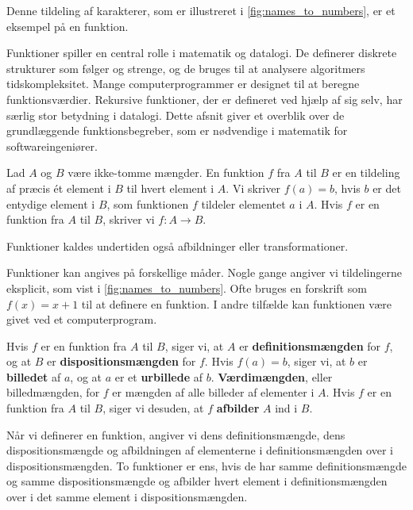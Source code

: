 Denne tildeling af karakterer, som er illustreret i \autoref{fig:names_to_numbers}, er et eksempel på en funktion.

Funktioner spiller en central rolle i matematik og datalogi. De definerer diskrete strukturer som følger og strenge, og de bruges til at analysere algoritmers tidskompleksitet. Mange computerprogrammer er designet til at beregne funktionsværdier. Rekursive funktioner, der er defineret ved hjælp af sig selv, har særlig stor betydning i datalogi. Dette afsnit giver et overblik over de grundlæggende funktionsbegreber, som er nødvendige i matematik for softwareingeniører.

\begin{definition}
Lad $A$ og $B$ være ikke-tomme mængder. En funktion $f$ fra $A$ til $B$ er en tildeling af præcis ét element i $B$ til hvert element i $A$. Vi skriver $f(a)=b$, hvis $b$ er det entydige element i $B$, som funktionen $f$ tildeler elementet $a$ i $A$. Hvis $f$ er en funktion fra $A$ til $B$, skriver vi $f: A \rightarrow B$.
\end{definition}

\begin{remark}
    Funktioner kaldes undertiden også afbildninger eller transformationer.
\end{remark}

Funktioner kan angives på forskellige måder. Nogle gange angiver vi tildelingerne eksplicit, som vist i \autoref{fig:names_to_numbers}. Ofte bruges en forskrift som \(f(x) = x + 1\) til at definere en funktion. I andre tilfælde kan funktionen være givet ved et computerprogram.

\begin{definition}
Hvis $f$ er en funktion fra $A$ til $B$, siger vi, at $A$ er \textbf{definitionsmængden} for $f$, og at $B$ er \textbf{dispositionsmængden} for $f$. Hvis $f(a)=b$, siger vi, at $b$ er \textbf{billedet} af $a$, og at $a$ er et \textbf{urbillede} af $b$. \textbf{Værdimængden}, eller billedmængden, for $f$ er mængden af alle billeder af elementer i $A$. Hvis $f$ er en funktion fra $A$ til $B$, siger vi desuden, at $f$ \textbf{afbilder} $A$ ind i $B$.    
\end{definition}

Når vi definerer en funktion, angiver vi dens definitionsmængde, dens dispositionsmængde og afbildningen af elementerne i definitionsmængden over i dispositionsmængden. To funktioner er ens, hvis de har samme definitionsmængde og samme dispositionsmængde og afbilder hvert element i definitionsmængden over i det samme element i dispositionsmængden. 

